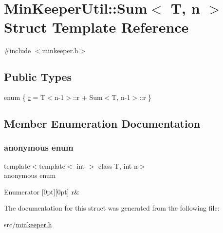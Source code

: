 \hypertarget{structMinKeeperUtil_1_1Sum}{}\section{Min\+Keeper\+Util\+:\+:Sum$<$ T, n $>$ Struct Template Reference}
\label{structMinKeeperUtil_1_1Sum}


{\ttfamily \#include $<$minkeeper.\+h$>$}

\subsection*{Public Types}
\begin{DoxyCompactItemize}
\item 
enum \{ \hyperlink{structMinKeeperUtil_1_1Sum_a6067fd8cbcbcb5363d01e7178a52e72aaae2122fe450b3f2170a837544faeb000}{r} = T$<$n-\/1$>$\+:\+:r + Sum$<$T, n-\/1$>$\+:\+:r
 \}
\end{DoxyCompactItemize}


\subsection{Member Enumeration Documentation}
\mbox{\label{structMinKeeperUtil_1_1Sum_a6067fd8cbcbcb5363d01e7178a52e72a}} 
\subsubsection{\texorpdfstring{anonymous enum}{anonymous enum}}
{\footnotesize\ttfamily template$<$template$<$ int $>$ class T, int n$>$ \\
anonymous enum}

\begin{DoxyEnumFields}{Enumerator}
[0pt][0pt]{}\mbox{\label{structMinKeeperUtil_1_1Sum_a6067fd8cbcbcb5363d01e7178a52e72aaae2122fe450b3f2170a837544faeb000}} 
r&\\
\hline

\end{DoxyEnumFields}


The documentation for this struct was generated from the following file\+:\begin{DoxyCompactItemize}
\item 
src/\hyperlink{minkeeper_8h}{minkeeper.\+h}\end{DoxyCompactItemize}
